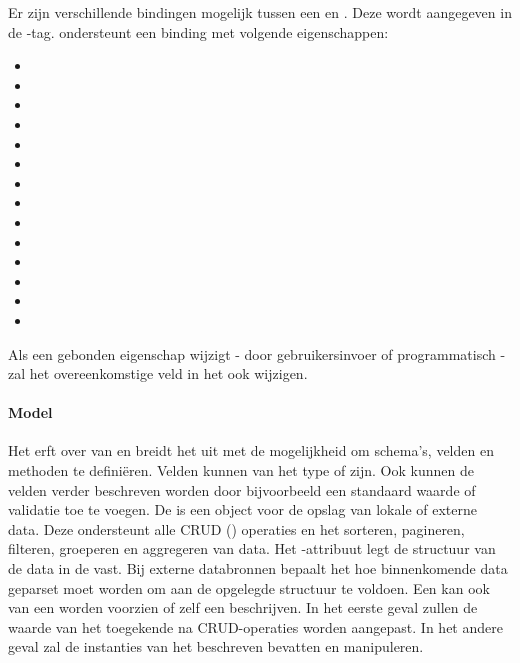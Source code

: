 Er zijn verschillende bindingen	 mogelijk tussen een  en .
Deze wordt aangegeven in de -tag.
\kendo{} ondersteunt een binding met volgende eigenschappen:  
\begin{itemize}
  \item {}
  \item {}
  \item {}
  \item {}
  \item {}
  \item {}
  \item {}
  \item {}
  \item {}
  \item {}
  \item {}
  \item {}
  \item {}
  \item {}
\end{itemize}
Als een gebonden eigenschap wijzigt - door gebruikersinvoer of programmatisch - zal het overeenkomstige veld in het  ook wijzigen.

\paragraph{Model}
Het  erft over van  en breidt het uit met de mogelijkheid om schema's,  velden en methoden te definiëren.  
Velden kunnen van het type  of  zijn.
Ook kunnen de velden verder beschreven worden door bijvoorbeeld een standaard waarde of validatie toe te voegen.
De  is een \kendo{} object voor de opslag van lokale of externe data.  
Deze ondersteunt alle CRUD () operaties en het sorteren, pagineren, filteren, groeperen en aggregeren van data.
Het -attribuut legt de structuur van de data in de  vast.
Bij externe databronnen bepaalt het hoe binnenkomende data geparset moet worden om aan de opgelegde structuur te voldoen.
Een  kan ook van een  worden voorzien of zelf een  beschrijven.
In het eerste geval zullen de waarde van het toegekende  na CRUD-operaties worden aangepast.
In het andere geval zal de  instanties van het beschreven  bevatten en manipuleren.


